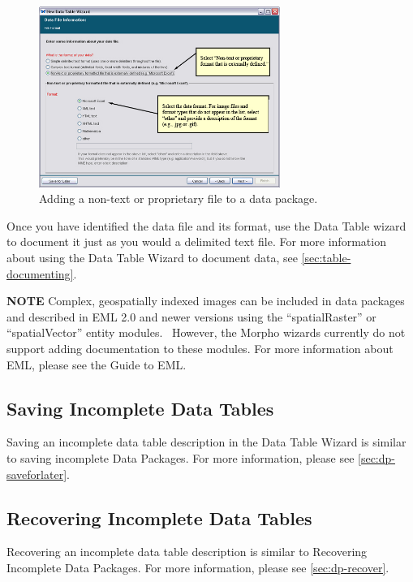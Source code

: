 \begin{figure}
  \centering
    \includegraphics[width=0.7\textwidth]{images/wizard-table-import-nontext.jpg}
  \caption{Adding a non-text or proprietary file to a data package.}
  \label{fig:wizard-table-import-nontext}
\end{figure}

Once you have identified the data file and its format, use the Data
Table wizard to document it just as you would a delimited text file. For
more information about using the Data Table Wizard to document data, see
\autoref{sec:table-documenting}.

\begin{shaded}
  \textbf{NOTE} Complex, geospatially indexed images can be included in
  data packages and described in EML 2.0 and newer versions using the
  ``spatialRaster'' or ``spatialVector'' entity modules.  However, the
  Morpho wizards currently do not support adding documentation to these
  modules. For more information about EML, please see the Guide to EML.
\end{shaded}

\subsection{Saving Incomplete Data Tables }

Saving an incomplete data table description in the Data Table Wizard is
similar to saving incomplete Data Packages. For more information, please
see \autoref{sec:dp-saveforlater}.

\subsection{Recovering Incomplete Data Tables}

Recovering an incomplete data table description is similar to Recovering
Incomplete Data Packages. For more information, please see
\autoref{sec:dp-recover}.

